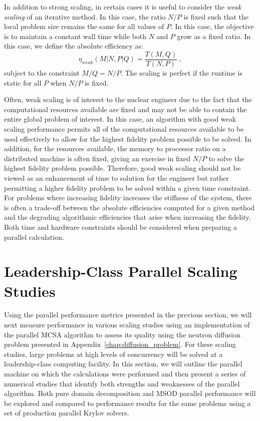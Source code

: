 In addition to strong scaling, in certain cases it is useful to
consider the \textit{weak scaling} of an iterative method. In this
case, the ratio $N/P$ is fixed such that the local problem size
remains the same for all values of $P$. In this case, the objective is
to maintain a constant wall time while both $N$ and $P$ grow as a
fixed ratio. In this case, we define the absolute efficiency as:
\begin{equation}
  \eta_{weak}(M|N,P|Q) = \frac{T(M,Q)}{T(N,P)}\:,
  \label{eq:weak_scaling_absolute}
\end{equation}
subject to the constraint $M/Q = N/P$. The scaling is perfect if the
runtime is static for all $P$ when $N/P$ is fixed. 

Often, weak scaling is of interest to the nuclear engineer due to the
fact that the computational resources available are fixed and may not
be able to contain the entire global problem of interest. In this
case, an algorithm with good weak scaling performance permits all of
the computational resources available to be used effectively to allow
for the highest fidelity problem possible to be solved. In addition,
for the resources available, the memory to processor ratio on a
distributed machine is often fixed, giving an exercise in fixed $N/P$
to solve the highest fidelity problem possible. Therefore, good weak
scaling should not be viewed as an enhancement of time to solution for
the engineer but rather permitting a higher fidelity problem to be
solved within a given time constraint. For problems where increasing
fidelity increases the stiffness of the system, there is often a
trade-off between the absolute efficiencies computed for a given
method and the degrading algorithmic efficiencies that arise when
increasing the fidelity. Both time and hardware constraints should be
considered when preparing a parallel calculation.

\clearpage

\section{Leadership-Class Parallel Scaling Studies\ }
\label{sec:leadership_scaling_studies}
Using the parallel performance metrics presented in the previous
section, we will next measure performance in various scaling studies
using an implementation of the parallel MCSA algorithm to assess its 
quality using the neutron diffusion problem presented in
Appendix~\ref{chap:diffusion_problem}. For these scaling studies,
large problems at high levels of concurrency will be solved at a
leadership-class computing facility. In this section, we will outline
the parallel machine on which the calculations were performed and then
present a series of numerical studies that identify both strengths and
weaknesses of the parallel algorithm. Both pure domain decomposition
and MSOD parallel performance will be explored and compared to
performance results for the same problems using a set of production
parallel Krylov solvers.

